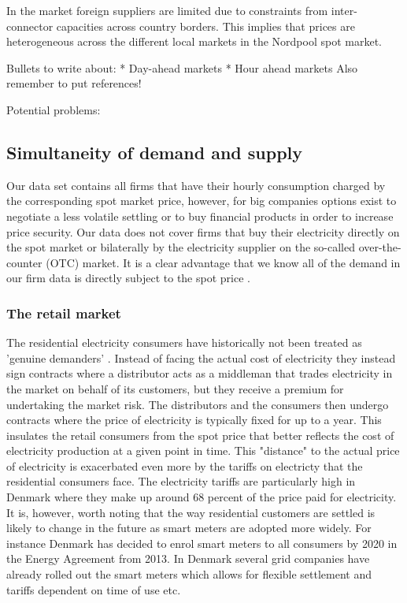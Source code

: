 In the market foreign suppliers are limited due to constraints from inter-connector capacities across country borders. This implies that prices are heterogeneous across the different local markets in the Nordpool spot market. 

Bullets to write about: 
* Day-ahead markets
* Hour ahead markets 
Also remember to put references! 

Potential problems: 


\subsection{Simultaneity of demand and supply}
\label{subsec:t_simultaneity}
Our data set contains all firms that have their hourly consumption charged by the corresponding spot market price, however, for big companies options exist to negotiate a less volatile settling or to buy financial products in order to increase price security. Our data does not cover firms that buy their electricity directly on the spot market or bilaterally by the electricity supplier on the so-called over-the-counter (OTC) market. It is a clear advantage that we know all of the demand in our firm data is directly subject to the spot price \citep{lijesen2007real}.


\subsubsection{The retail market} %
\label{subsubsec: t_resmarket}
The residential electricity consumers have historically not been treated as 'genuine demanders' \citep{kirschen2003demand}. Instead of facing the actual cost of electricity they instead sign contracts where a distributor acts as a middleman that trades electricity in the market on behalf of its customers, but they receive a premium for undertaking the market risk. The distributors and the consumers then undergo contracts where the price of electricity is typically fixed for up to a year. This insulates the retail consumers from the spot price that better reflects the cost of electricity production at a given point in time. This "distance" to the actual price of electricity is exacerbated even more by the tariffs on electricty that the residential consumers face. The electricity tariffs are particularly high in Denmark where they make up around 68 percent of the price paid for electricity. \smallskip \\ 

It is, however, worth noting that the way residential customers are settled is likely to change in the future as smart meters are adopted more widely. For instance Denmark has decided to enrol smart meters to all consumers by 2020 in the Energy Agreement from 2013. In Denmark several grid companies have already rolled out the smart meters which allows for flexible settlement and tariffs dependent on time of use etc. 

